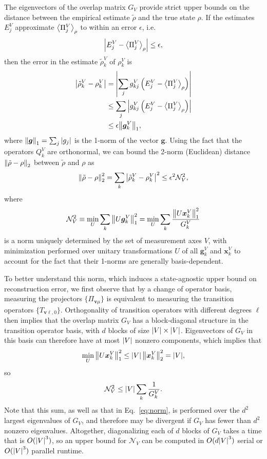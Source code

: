 \documentclass[notitlepage,twocolumn]{revtex4-2}
\newcommand{\f}[2]{\dfrac{#1}{#2}} %
\newcommand{\p}[1]{\left(#1\right)} %
\renewcommand{\set}[1]{\{#1\}} %
\newcommand{\bk}{\Braket} %
\renewcommand{\v}{\bm} %
\newcommand{\1}{\mathds{1}}
\newcommand{\N}{\mathcal{N}}
\begin{document}
The eigenvectors of the overlap matrix $G_V$ provide strict upper bounds on the distance between the empirical estimate $\tilde\rho$ and the true state $\rho$.
If the estimates $E^V_j$ approximate $\bk{\Pi^V_j}_\rho$ to within an error $\epsilon$, i.e.
\begin{align}
  \abs{E^V_j-\bk{\Pi^V_j}_\rho} \le \epsilon,
\end{align}
then the error in the estimate $\tilde\rho^V_k$ of $\rho^V_k$ is
\begin{align}
  \abs{\tilde\rho^V_k-\rho^V_k}
  &= \abs{\sum_j g_{kj}^V \p{E^V_j-\bk{\Pi^V_j}_\rho}} \\
  &\le \sum_j \abs{g_{kj}^V \p{E^V_j-\bk{\Pi^V_j}_\rho}} \\
  &\le \epsilon \norm{\v g^V_k}_1,
\end{align}
where $\norm{\v g}_1=\sum_j\abs{g_j}$ is the 1-norm of the vector $\v g$.
Using the fact that the operators $Q^V_k$ are orthonormal, we can bound the 2-norm (Euclidean) distance $\norm{\tilde\rho-\rho}_2$ between $\tilde\rho$ and $\rho$ as
\begin{align}
  \norm{\tilde\rho-\rho}_2^2
  = \sum_k \abs{\tilde\rho^V_k - \rho^V_k}^2
  \le \epsilon^2 \N_V^2,
\end{align}
where
\begin{align}
  \N_V^2 \equiv \min_U \sum_k \norm{U\v g^V_k}_1^2
  = \min_U \sum_k \f{\norm{U\v x^V_k}_1^2}{G^V_k}
  \label{eq:norm}
\end{align}
is a norm uniquely determined by the set of measurement axes $V$, with minimization performed over unitary transformations $U$ of all $\v g^V_k$ and $\v x^V_k$ to account for the fact that their 1-norms are generally basis-dependent.

To better understand this norm, which induces a state-agnostic upper bound on reconstruction error, we first observe that by a change of operator basis, measuring the projectors $\set{\Pi_{\v v\mu}}$ is equivalent to measuring the transition operators $\set{T_{\v v\ell,0}}$.
Orthogonality of transition operators with different degrees $\ell$ then implies that the overlap matrix $G_V$ has a block-diagonal structure in the transition operator basis, with $d$ blocks of size $\abs{V}\times\abs{V}$.
Eigenvectors of $G_V$ in this basis can therefore have at most $\abs{V}$ nonzero components, which implies that
\begin{align}
  \min_U \norm{U\v x^V_k}_1^2
  \le \abs{V}\, \norm{\v x^V_k}_2^2
  = \abs{V},
\end{align}
so
\begin{align}
  \N_V^2 \le \abs{V} \sum_k \f1{G^V_k}.
\end{align}
Note that this sum, as well as that in Eq.~\eqref{eq:norm}, is performed over the $d^2$ largest eigenvalues of $G_V$, and therefore may be divergent if $G_V$ has fewer than $d^2$ nonzero eigenvalues.
Altogether, diagonalizing each of $d$ blocks of $G_V$ takes a time that is $O(\abs{V}^3)$, so an upper bound for $\N_V$ can be computed in $O(d\abs{V}^3)$ serial or $O(\abs{V}^3)$ parallel runtime.
\end{document}
